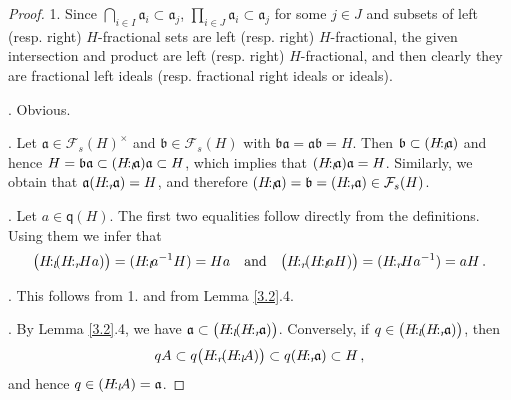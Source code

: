 \documentclass[a4paper]{amsart}
\theoremstyle{definition}
\numberwithin{equation}{section}
\begin{document}
\begin{proof}
1. Since $\bigcap_{i \in I} \mathfrak a_i \subset \mathfrak a_j$,  $\prod_{i \in J} \mathfrak a_i \subset \mathfrak a_j$ for some $j \in J$ and subsets of left (resp. right)
$H$-fractional sets are left (resp. right) $H$-fractional,
the given intersection and product are left (resp. right) $H$-fractional, and then clearly they are
 fractional left
ideals (resp. fractional right ideals or ideals).

. Obvious.

. Let $\mathfrak a \in \mathcal F_s (H)^{\times}$ and $\mathfrak b
\in \mathcal F_s (H)$ with $\mathfrak b \mathfrak a = \mathfrak a
\mathfrak b = H$. Then $\mathfrak b \subset (H {\negthinspace :_l \negthinspace} \mathfrak a)$
and hence $H = \mathfrak b \mathfrak a \subset (H {\negthinspace :_l \negthinspace} \mathfrak a)
\mathfrak a \subset H$, which implies that $(H {\negthinspace :_l \negthinspace} \mathfrak a)
\mathfrak a = H$. Similarly, we obtain that $\mathfrak a (H {\negthinspace :_r \negthinspace}
\mathfrak a) = H$, and therefore $(H {\negthinspace :_l \negthinspace} \mathfrak a) = \mathfrak b
= (H {\negthinspace :_r \negthinspace} \mathfrak a) \in \mathcal F_s (H)$.

. Let $a \in \mathsf q (H)$. The first two equalities follow
directly from the definitions. Using them we infer that
\[
\big( H {\negthinspace :_l \negthinspace} (H {\negthinspace :_r \negthinspace} Ha) \big) = ( H {\negthinspace :_l \negthinspace} a^{-1}H) = Ha \quad
\text{and} \quad \big( H {\negthinspace :_r \negthinspace} (H  {\negthinspace :_l \negthinspace} aH) \big) = (H {\negthinspace :_r \negthinspace} Ha^{-1})
= aH \,.
\]

. This follows from 1. and from Lemma \ref{3.2}.4.

. By Lemma \ref{3.2}.4, we have $\mathfrak a \subset  \big( H {\negthinspace :_l \negthinspace} (H {\negthinspace :_r \negthinspace} \mathfrak a)\big)$.
Conversely, if $q \in \big( H {\negthinspace :_l \negthinspace} (H {\negthinspace :_r \negthinspace} \mathfrak a)\big)$, then
\[
q A \subset q \big( H {\negthinspace :_r \negthinspace} (H {\negthinspace :_l \negthinspace} A) \big)
\subset q (H {\negthinspace :_r \negthinspace} \mathfrak a) \subset H \,,
\]
and hence $q \in (H {\negthinspace :_l \negthinspace} A) = \mathfrak a$.
\end{proof}
\end{document}

